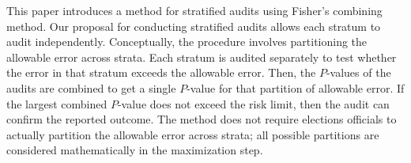 \documentclass[runningheads]{llncs}
\begin{document}
This paper introduces a method for stratified audits using Fisher's combining method.
Our proposal for conducting stratified audits allows each stratum to audit independently.
Conceptually, the procedure involves partitioning the allowable error across strata.
Each stratum is audited separately to test whether the error in that stratum exceeds the allowable error.
Then, the $P$-values of the audits are combined to get a single $P$-value for that partition of allowable error.
If the largest combined $P$-value does not exceed the risk limit, then the audit can confirm the reported outcome.
The method does not require elections officials to actually partition the allowable error across strata;
all possible partitions are considered mathematically in the maximization step.

%
\end{document}
